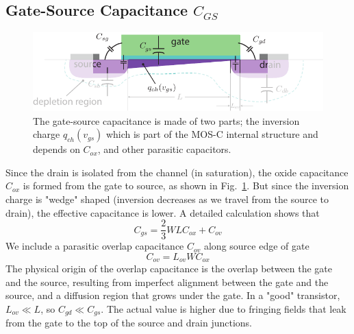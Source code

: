 \subsection{Gate-Source Capacitance \texorpdfstring{$C_{GS}$}{}}
\begin{figure}[tb]
\centering
\includegraphics[width=.75\columnwidth]{mos_caps_Cgs}
\caption{The gate-source capacitance is made of two parts; the inversion charge $q_{ch}(v_{gs})$ which is part of the MOS-C internal structure and depends on $C_{ox}$, and other parasitic capacitors.} \label{fig:mos_caps_Cgs}
\end{figure}
Since the drain is isolated from the channel (in saturation), the oxide capacitance $C_{ox}$ is formed from the gate to source, as shown in Fig.~\ref{fig:mos_caps_Cgs}.  But since the inversion charge is "wedge" shaped (inversion decreases as we travel from the source to drain), the effective capacitance is lower.  A detailed calculation shows that
    \begin{equation}
        C_{gs} = \frac{2}{3} W L C_{ox} + C_{ov} 
    \end{equation} 
We include a parasitic overlap capacitance $C_{ov}$ along source edge of gate 
    \begin{equation}
        C_{ov} = L_{ov} W C_{ox}
    \end{equation}
The physical origin of the overlap capacitance is the overlap between the gate and the source, resulting from imperfect alignment between the gate and the source, and a diffusion region that grows under the gate.   In a "good" transistor, $L_{ov} \ll L$, so $C_{gd} \ll C_{gs}$.  The actual value is higher due to fringing fields that leak from the gate to the top of the source and drain junctions.
